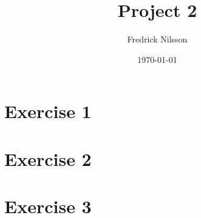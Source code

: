 \documentclass[12pt]{article}
\title{Project 2}
\author{Fredrick Nilsson}
\date{\today}
\begin{document}
\maketitle

\tableofcontents

\newpage

\section*{Exercise 1}

\newpage

\section*{Exercise 2}

\newpage

\section*{Exercise 3}

\newpage


\end{document}
